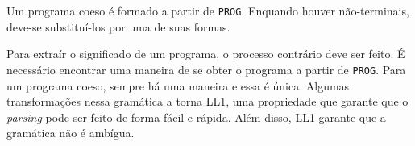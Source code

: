 Um programa coeso é formado a partir de \texttt{PROG}.
Enquando houver não-terminais, deve-se substituí-los por uma de suas formas.

Para extraír o significado de um programa, o processo contrário deve ser feito. 
É necessário encontrar uma maneira de se obter o programa a partir de \texttt{PROG}.
Para um programa coeso, sempre há uma maneira e essa é única.
Algumas transformações nessa gramática a torna LL1,
uma propriedade que garante que o \textit{parsing} pode ser feito de forma fácil e rápida.
Além disso, LL1 garante que a gramática não é ambígua. \cite{GramCheck}


